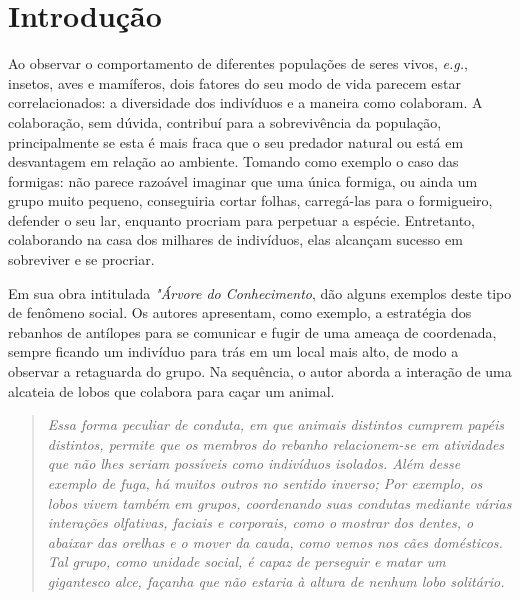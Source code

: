 
\chapter{Introdução}
\label{chap:introducao}

Ao observar o comportamento de diferentes populações de seres vivos, \textit{e.g.}, insetos, aves e mamíferos, dois fatores do seu modo de vida parecem estar correlacionados: a diversidade dos indivíduos e a maneira como colaboram. A colaboração, sem dúvida, contribuí para a sobrevivência da população, principalmente se esta é mais fraca que o seu predador natural ou está em desvantagem em relação ao ambiente. Tomando como exemplo o caso das formigas: não parece razoável imaginar que uma única formiga, ou ainda um grupo muito pequeno, conseguiria cortar folhas, carregá-las para o formigueiro, defender o seu lar, enquanto procriam para perpetuar a espécie. Entretanto, colaborando na casa dos milhares de indivíduos, elas alcançam sucesso em sobreviver e se procriar.

Em sua obra intitulada \textit{"Árvore do Conhecimento},  dão alguns exemplos deste tipo de  fenômeno social. Os autores apresentam, como exemplo, a estratégia dos rebanhos de antílopes para se comunicar e fugir de uma ameaça de coordenada, sempre ficando um indivíduo para trás em um local mais alto, de modo a observar a retaguarda do grupo. Na sequência, o autor aborda a interação de uma alcateia de lobos que colabora para caçar um animal.

\begin{quote}
\textit{Essa forma peculiar de conduta, em que animais distintos cumprem papéis distintos, permite que os membros do rebanho relacionem-se em atividades que não lhes seriam possíveis como indivíduos isolados. Além desse exemplo de fuga, há muitos outros no sentido inverso; Por exemplo, os lobos vivem também em grupos, coordenando suas condutas mediante várias interações olfativas, faciais e corporais, como o mostrar dos dentes, o abaixar das orelhas e o mover da cauda, como vemos nos cães domésticos. Tal grupo, como unidade social, é capaz de perseguir e matar um gigantesco alce, façanha que não estaria à altura de nenhum lobo solitário.} \cite{maturana2001}
\end{quote}

